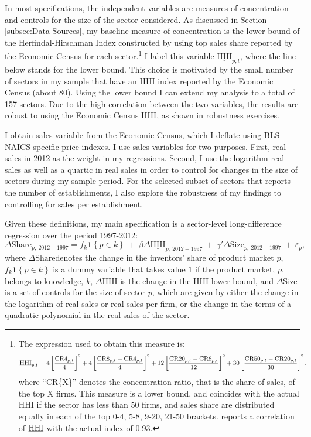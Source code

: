 In most specifications, the independent variables are measures of
concentration and controls for the size of the sector considered.
As discussed in Section \ref{subsec:Data-Sources}, my baseline measure
of concentration is the lower bound of the Herfindal-Hirschman Index
constructed by \citet{keilTroubleApproximatingIndustry2017} using
top sales share reported by the Economic Census for each sector.\footnote{The expression used to obtain this measure is: 
\begin{align*}
\text{\ensuremath{\underbar{HHI}}}_{p,t} & =4\left[\frac{\text{CR4}_{p,t}}{4}\right]^{2}+4\left[\frac{\text{CR8}_{p,t}-\text{CR4}_{p,t}}{4}\right]^{2}+12\left[\frac{\text{CR20}_{p,t}-\text{CR8}_{p,t}}{12}\right]^{2}+30\left[\frac{\text{CR50}_{p,t}-\text{CR20}_{p,t}}{30}\right]^{2},
\end{align*}
where ``CR\{X\}'' denotes the concentration ratio, that is the share
of sales, of the top X firms. This measure is a lower bound, and coincides
with the actual HHI if the sector has less than 50 firms, and sales
share are distributed equally in each of the top 0-4, 5-8, 9-20, 21-50
brackets. \citet{keilTroubleApproximatingIndustry2017} reports a
correlation of $\text{\ensuremath{\underbar{HHI}}}$ with the actual
index of 0.93.} I label this variable $\underline{\text{HHI}}_{p,t}$, where the
line below stands for the lower bound. This choice is motivated by
the small number of sectors in my sample that have an HHI index reported
by the Economic Census (about 80). Using the lower bound I can extend
my analysis to a total of 157 sectors. Due to the high correlation
between the two variables, the results are robust to using the Economic
Census HHI, as shown in robustness exercises. 

I obtain sales variable from the Economic Census, which I deflate
using BLS NAICS-specific price indexes. I use sales variables for
two purposes. First, real sales in 2012 as the weight in my regressions.
Second, I use the logarithm real sales as well as a quartic in real
sales in order to control for changes in the size of sectors during
my sample period. For the selected subset of sectors that reports
the number of establishments, I also explore the robustness of my
findings to controlling for sales per establishment. 

Given these definitions, my main specification is a sector-level long-difference
regression over the period 1997-2012:
\begin{equation}
\Delta\text{Share}_{p,\ 2012-1997}=f_{k}\mathbf{1}\left\{ p\in k\right\} \ +\ \beta\Delta\underline{\text{HHI}}_{p,\ 2012-1997}\ +\ \gamma'\Delta\text{Size}_{p,\ 2012-1997}\ +\ \varepsilon_{p},\label{eq: spec}
\end{equation}
where $\Delta\text{Share}$denotes the change in the inventors' share
of product market $p$, $f_{k}\mathbf{1}\left\{ p\in k\right\} $
is a dummy variable that takes value $1$ if the product market, $p$,
belongs to knowledge, $k$, $\Delta\underline{\text{HHI}}$ is the
change in the HHI lower bound, and $\Delta\text{Size}$ is a set of
controls for the size of sector $p$, which are given by either the
change in the logarithm of real sales or real sales per firm, or the
change in the terms of a quadratic polynomial in the real sales of
the sector. 


